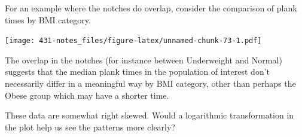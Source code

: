 \documentclass[
]{book}
\newenvironment{Shaded}{\begin{snugshade}}{\end{snugshade}}
\newcommand{\DataTypeTok}[1]{\textcolor[rgb]{0.13,0.29,0.53}{#1}}
\newcommand{\FloatTok}[1]{\textcolor[rgb]{0.00,0.00,0.81}{#1}}
\newcommand{\KeywordTok}[1]{\textcolor[rgb]{0.13,0.29,0.53}{\textbf{#1}}}
\newcommand{\NormalTok}[1]{#1}
\newcommand{\OperatorTok}[1]{\textcolor[rgb]{0.81,0.36,0.00}{\textbf{#1}}}
\newcommand{\OtherTok}[1]{\textcolor[rgb]{0.56,0.35,0.01}{#1}}
\newcommand{\StringTok}[1]{\textcolor[rgb]{0.31,0.60,0.02}{#1}}
\begin{document}
For an example where the notches do overlap, consider the comparison of plank times by BMI category.

\begin{Shaded}
\end{Shaded}

\texttt{[image: 431-notes\_files/figure-latex/unnamed-chunk-73-1.pdf]}

The overlap in the notches (for instance between Underweight and Normal) suggests that the median plank times in the population of interest don't necessarily differ in a meaningful way by BMI category, other than perhaps the Obese group which may have a shorter time.

These data are somewhat right skewed. Would a logarithmic transformation in the plot help us see the patterns more clearly?
\end{document}
